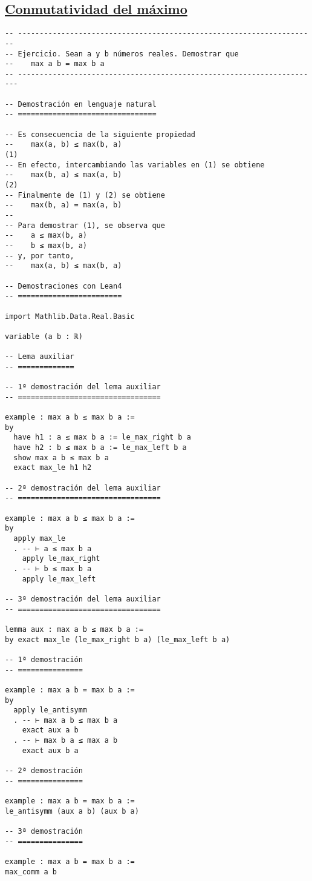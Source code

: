 \subsection{\href{./src/Basicos/Conmutatividad\_del\_maximo.lean}{Conmutatividad del máximo}}
\label{sec:orgd1888a4}
\begin{verbatim}
-- ---------------------------------------------------------------------
-- Ejercicio. Sean a y b números reales. Demostrar que
--    max a b = max b a
-- ----------------------------------------------------------------------

-- Demostración en lenguaje natural
-- ================================

-- Es consecuencia de la siguiente propiedad
--    max(a, b) ≤ max(b, a)                                          (1)
-- En efecto, intercambiando las variables en (1) se obtiene
--    max(b, a) ≤ max(a, b)                                          (2)
-- Finalmente de (1) y (2) se obtiene
--    max(b, a) = max(a, b)
--
-- Para demostrar (1), se observa que
--    a ≤ max(b, a)
--    b ≤ max(b, a)
-- y, por tanto,
--    max(a, b) ≤ max(b, a)

-- Demostraciones con Lean4
-- ========================

import Mathlib.Data.Real.Basic

variable (a b : ℝ)

-- Lema auxiliar
-- =============

-- 1ª demostración del lema auxiliar
-- =================================

example : max a b ≤ max b a :=
by
  have h1 : a ≤ max b a := le_max_right b a
  have h2 : b ≤ max b a := le_max_left b a
  show max a b ≤ max b a
  exact max_le h1 h2

-- 2ª demostración del lema auxiliar
-- =================================

example : max a b ≤ max b a :=
by
  apply max_le
  . -- ⊢ a ≤ max b a
    apply le_max_right
  . -- ⊢ b ≤ max b a
    apply le_max_left

-- 3ª demostración del lema auxiliar
-- =================================

lemma aux : max a b ≤ max b a :=
by exact max_le (le_max_right b a) (le_max_left b a)

-- 1ª demostración
-- ===============

example : max a b = max b a :=
by
  apply le_antisymm
  . -- ⊢ max a b ≤ max b a
    exact aux a b
  . -- ⊢ max b a ≤ max a b
    exact aux b a

-- 2ª demostración
-- ===============

example : max a b = max b a :=
le_antisymm (aux a b) (aux b a)

-- 3ª demostración
-- ===============

example : max a b = max b a :=
max_comm a b
\end{verbatim}

